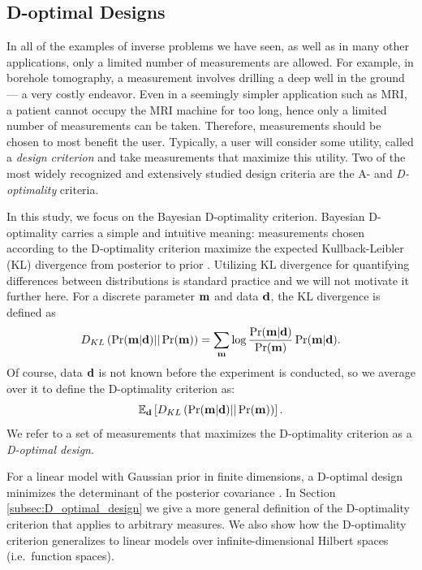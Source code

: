 \subsection{D-optimal Designs}\label{subsec:D}
In all of the examples of inverse problems we have seen, as well as in
many other applications, only a limited number of measurements are
allowed. For example, in borehole tomography, a measurement involves
drilling a deep well in the ground --- a very costly endeavor. Even in
a seemingly simpler application such as MRI, a patient cannot occupy
the MRI machine for too long, hence only a limited number of
measurements can be taken. Therefore, measurements should be chosen to
most benefit the user. Typically, a user will consider some utility,
called a \emph{design criterion} and take measurements that maximize
this utility. Two of the most widely recognized and extensively
studied design criteria are the A- and \emph{D-optimality} criteria.

In this study, we focus on the Bayesian D-optimality
criterion. Bayesian D-optimality carries a simple and intuitive
meaning: measurements chosen according to the D-optimality criterion
maximize the expected Kullback-Leibler (KL) divergence from posterior
to prior \cite{chaloner1995, AlexanderianGloorGhattas14,
  CoverThomas91}. Utilizing KL divergence for quantifying differences
between distributions is standard practice and we will not motivate it
further here. For a discrete parameter $\mathbf{m}$ and data $\mathbf{d}$, the
KL divergence is defined as
\begin{equation}\label{eq:basic_KL}
  D_{KL}\left (\Pr(\param|\data)||\Pr(\param)\right ) =  \sum_{\param} \log
  \frac{\Pr(\param|\data)}{\Pr(\param)} \Pr(\param|\data). 
\end{equation}
Of course, data $\mathbf{d}$ is not known before the experiment is
conducted, so we average over it to define the D-optimality criterion
as:
\begin{equation*}
  \mathbb{E}_{\data}\left [ D_{KL}\left (\Pr(\param|\data)||\Pr(\param)\right ) \right ].
\end{equation*}
We refer to a set of measurements that maximizes the D-optimality
criterion as a \emph{D-optimal design}.

For a linear model with Gaussian prior in finite dimensions, a
D-optimal design minimizes the determinant of the posterior covariance
\cite{chaloner1995}. In Section \ref{subsec:D_optimal_design} we give
a more general definition of the D-optimality criterion that applies
to arbitrary measures. We also show how the D-optimality criterion
generalizes to linear models over infinite-dimensional Hilbert spaces
(i.e.~function spaces).


